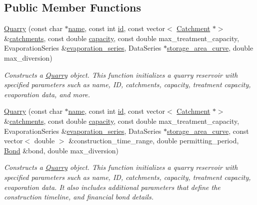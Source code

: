 \subsection*{Public Member Functions}
\begin{DoxyCompactItemize}
\item 
\mbox{\hyperlink{classQuarry_a126fddda9e5deeb667a6a9dbb0533470}{Quarry}} (const char $\ast$\mbox{\hyperlink{classWaterSource_a846ea74c5b453d014f594d41fee8c765}{name}}, const int \mbox{\hyperlink{classWaterSource_a6eafe5dfefd317877d1244e8a7c6e742}{id}}, const vector$<$ \mbox{\hyperlink{classCatchment}{Catchment}} $\ast$$>$ \&\mbox{\hyperlink{classWaterSource_a8c18c34f23f8a06685c1d12f462ed830}{catchments}}, const double \mbox{\hyperlink{classWaterSource_a2ec257b415b248214a8bce7fc5267723}{capacity}}, const double max\+\_\+treatment\+\_\+capacity, Evaporation\+Series \&\mbox{\hyperlink{classReservoir_a2d2d9b302c13703309bb798d24136810}{evaporation\+\_\+series}}, Data\+Series $\ast$\mbox{\hyperlink{classReservoir_a46bd5b750963dfa9a57b247fd77ab8ff}{storage\+\_\+area\+\_\+curve}}, double max\+\_\+diversion)
\begin{DoxyCompactList}\small\item\em Constructs a \mbox{\hyperlink{classQuarry}{Quarry}} object. This function initializes a quarry reservoir with specified parameters such as name, ID, catchments, capacity, treatment capacity, evaporation data, and more. \end{DoxyCompactList}\item 
\mbox{\hyperlink{classQuarry_a13cc1caeda6846900893f8d24c49b111}{Quarry}} (const char $\ast$\mbox{\hyperlink{classWaterSource_a846ea74c5b453d014f594d41fee8c765}{name}}, const int \mbox{\hyperlink{classWaterSource_a6eafe5dfefd317877d1244e8a7c6e742}{id}}, const vector$<$ \mbox{\hyperlink{classCatchment}{Catchment}} $\ast$$>$ \&\mbox{\hyperlink{classWaterSource_a8c18c34f23f8a06685c1d12f462ed830}{catchments}}, const double \mbox{\hyperlink{classWaterSource_a2ec257b415b248214a8bce7fc5267723}{capacity}}, const double max\+\_\+treatment\+\_\+capacity, Evaporation\+Series \&\mbox{\hyperlink{classReservoir_a2d2d9b302c13703309bb798d24136810}{evaporation\+\_\+series}}, Data\+Series $\ast$\mbox{\hyperlink{classReservoir_a46bd5b750963dfa9a57b247fd77ab8ff}{storage\+\_\+area\+\_\+curve}}, const vector$<$ double $>$ \&construction\+\_\+time\+\_\+range, double permitting\+\_\+period, \mbox{\hyperlink{classBond}{Bond}} \&bond, double max\+\_\+diversion)
\begin{DoxyCompactList}\small\item\em Constructs a \mbox{\hyperlink{classQuarry}{Quarry}} object. This function initializes a quarry reservoir with specified parameters such as name, ID, catchments, capacity, treatment capacity, evaporation data. It also includes additional parameters that define the construction timeline, and financial bond details. \end{DoxyCompactList}\item 

\end{DoxyCompactItemize}
